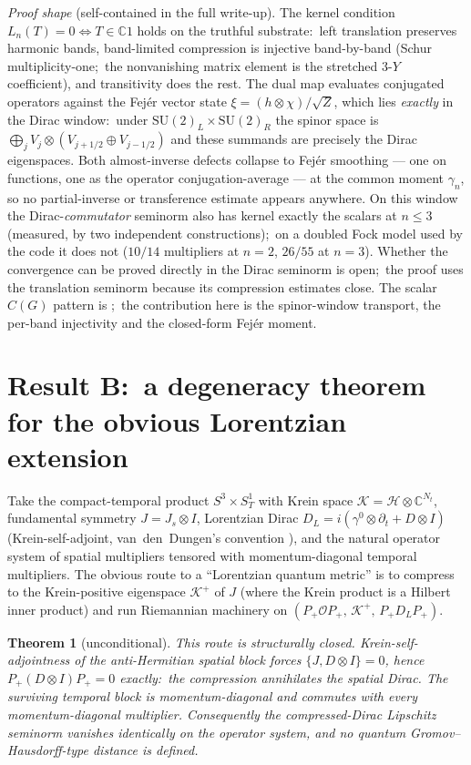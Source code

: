 \documentclass[11pt]{article}
\newtheorem{theorem}{Theorem}
\theoremstyle{remark}
\newcommand{\C}{\mathbb{C}}
\newcommand{\Op}{\mathcal{O}}
\newcommand{\DCH}{D}
\begin{document}
\noindent\emph{Proof shape} (self-contained in the full write-up).
The kernel condition $L_n(T) = 0 \Leftrightarrow T \in \C 1$ holds on
the truthful substrate:\ left translation preserves harmonic bands,
band-limited compression is injective band-by-band (Schur
multiplicity-one;\ the nonvanishing matrix element is the stretched
$3$-$Y$ coefficient), and transitivity does the rest. The dual map
evaluates conjugated operators against the Fej\'er vector state
$\xi = (h \otimes \chi)/\sqrt{Z}$, which lies \emph{exactly} in the
Dirac window:\ under $\mathrm{SU}(2)_L \times \mathrm{SU}(2)_R$ the
spinor space is $\bigoplus_j V_j \otimes (V_{j+1/2} \oplus
V_{j-1/2})$ and these summands are precisely the Dirac eigenspaces.
Both almost-inverse defects collapse to Fej\'er smoothing — one on
functions, one as the operator conjugation-average — at the common
moment $\gamma_n$, so no partial-inverse or transference estimate
appears anywhere. On this window the Dirac-\emph{commutator} seminorm
also has kernel exactly the scalars at $n \le 3$ (measured, by two
independent constructions);\ on a doubled Fock model used by the code
it does not ($10/14$ multipliers at $n = 2$, $26/55$ at $n = 3$).
Whether the convergence can be proved directly in the Dirac seminorm
is open;\ the proof uses the translation seminorm because its
compression estimates close. The
scalar $C(G)$ pattern is \cite{GEvS2023};\ the contribution here is
the spinor-window transport, the per-band injectivity and the
closed-form Fej\'er moment.

\section{Result B:\ a degeneracy theorem for the obvious Lorentzian
extension}

Take the compact-temporal product $S^3 \times S^1_T$ with Krein space
$\mathcal{K} = \mathcal{H} \otimes \C^{N_t}$, fundamental symmetry
$J = J_s \otimes I$, Lorentzian Dirac
$D_L = i(\gamma^0 \otimes \partial_t + \DCH \otimes I)$
(Krein-self-adjoint, van~den~Dungen's convention \cite{vdD2016}),
and the natural operator system of spatial multipliers tensored with
momentum-diagonal temporal multipliers. The obvious route to a
``Lorentzian quantum metric'' is to compress to the Krein-positive
eigenspace $\mathcal{K}^+$ of $J$ (where the Krein product is a
Hilbert inner product) and run Riemannian machinery on
$(P_+ \Op P_+,\, \mathcal{K}^+,\, P_+ D_L P_+)$.

\begin{theorem}[unconditional]
This route is structurally closed. Krein-self-adjointness of the
anti-Hermitian spatial block forces
$\{J, \DCH \otimes I\} = 0$, hence
$P_+ (\DCH \otimes I) P_+ = 0$ exactly:\ the compression annihilates
the spatial Dirac. The surviving temporal block is momentum-diagonal
and commutes with every momentum-diagonal multiplier. Consequently
the compressed-Dirac Lipschitz seminorm vanishes \emph{identically}
on the operator system, and no quantum Gromov--Hausdorff-type
distance is defined.
\end{theorem}
\end{document}
